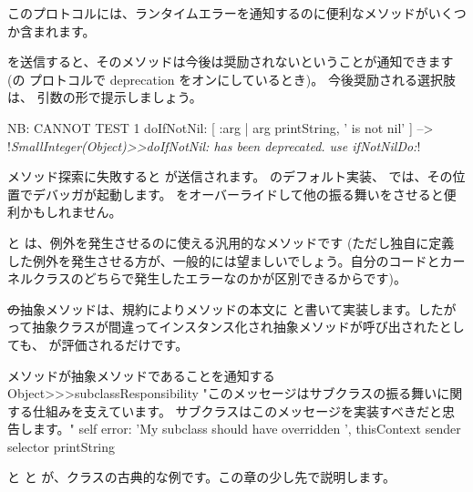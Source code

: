 \documentclass[a4paper,10pt,twoside]{book}
\begin{document}
このプロトコルには、ランタイムエラーを通知するのに便利なメソッドがいくつか含まれます。

 を送信すると、そのメソッドは今後は奨励されないということが通知できます(の  プロトコルで deprecation をオンにしているとき)。
今後奨励される選択肢は、 引数の形で提示しましょう。

\begin{code}{NB: CANNOT TEST}
1 doIfNotNil: [ :arg | arg printString, ' is not nil' ]
  --> !\emph{SmallInteger(Object)>>doIfNotNil: has been deprecated. use ifNotNilDo:}!
\end{code}

メソッド探索に失敗すると  が送信されます。 のデフォルト実装、\ie{} では、その位置でデバッガが起動します。 をオーバーライドして他の振る舞いをさせると便利かもしれません。


 と  は、例外を発生させるのに使える汎用的なメソッドです
(ただし独自に定義した例外を発生させる方が、一般的には望ましいでしょう。自分のコードとカーネルクラスのどちらで発生したエラーなのかが区別できるからです)。

\st の抽象メソッドは、規約によりメソッドの本文に  と書いて実装します。したがって抽象クラスが間違ってインスタンス化され抽象メソッドが呼び出されたとしても、 が評価されるだけです。

\begin{method}{メソッドが抽象メソッドであることを通知する\protect\footnotemark}
Object>>>subclassResponsibility
    "このメッセージはサブクラスの振る舞いに関する仕組みを支えています。
    サブクラスはこのメッセージを実装すべきだと忠告します。"
    self error: 'My subclass should have overridden ', thisContext sender selector printString
\end{method}%

 と  と  が、クラスの古典的な例です。この章の少し先で説明します。
\end{document}
